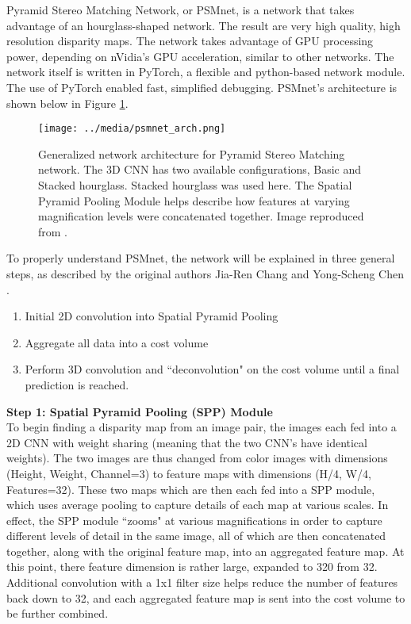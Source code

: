 Pyramid Stereo Matching Network, or PSMnet, is a network that takes advantage of an hourglass-shaped network. The result are very high quality, high resolution disparity maps. The network takes advantage of GPU processing power, depending on nVidia's GPU acceleration, similar to other networks. The network itself is written in PyTorch, a flexible and python-based network module. The use of PyTorch enabled fast, simplified debugging. PSMnet's architecture is shown below in Figure \ref{psmnet_arch}.


\begin{figure}[ht]
	\texttt{[image: ../media/psmnet\_arch.png]}
	\caption{Generalized network architecture for Pyramid Stereo Matching network. The 3D CNN has two available configurations, Basic and Stacked hourglass. Stacked hourglass was used here. The Spatial Pyramid Pooling Module helps describe how features at varying magnification levels were concatenated together. Image reproduced from \cite{chang_pyramid_2018}.}
	\label{psmnet_arch}
\end{figure}


To properly understand PSMnet, the network will be explained in three general steps, as described by the original authors Jia-Ren Chang and Yong-Scheng Chen \cite{chang_pyramid_2018}. 

\begin{enumerate}\itemsep=-0.5em
    \item Initial 2D convolution into Spatial Pyramid Pooling 
    \item Aggregate all data into a cost volume
    \item Perform 3D convolution and ``deconvolution" on the cost volume until a final prediction is reached.
\end{enumerate}

\textbf{{\large Step 1: Spatial Pyramid Pooling (SPP) Module}} \\
To begin finding a disparity map from an image pair, the images each fed into a 2D CNN with weight sharing (meaning that the two CNN's have identical weights). The two images are thus changed from
color images with dimensions (Height, Weight, Channel=3) to feature maps with dimensions (H/4, W/4, Features=32). These two maps which are then each fed into a SPP module, which uses average pooling to capture details of each map at various scales. In effect, the SPP module ``zooms" at various magnifications in order to capture different levels of detail in the same image, all of which are then concatenated together, along with the original feature map, into an aggregated feature map. At this point, there feature dimension is rather large, expanded to 320 from 32. Additional convolution with a 1x1 filter size helps reduce the number of features back down to 32, and each aggregated feature map is sent into the cost volume to be further combined.

